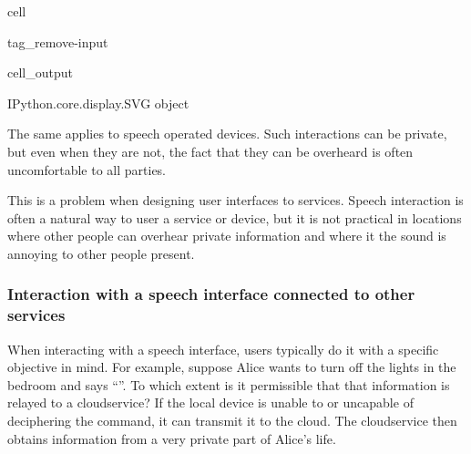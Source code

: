 \documentclass[letterpaper,10pt,english]{jupyterBook}
\begin{document}
\begin{sphinxuseclass}{cell}
\begin{sphinxuseclass}{tag_remove-input}\begin{sphinxVerbatimOutput}

\begin{sphinxuseclass}{cell_output}
\begin{sphinxVerbatim}[commandchars=\\\{\}]
\PYGZlt{}IPython.core.display.SVG object\PYGZgt{}
\end{sphinxVerbatim}

\end{sphinxuseclass}\end{sphinxVerbatimOutput}

\end{sphinxuseclass}
\end{sphinxuseclass}
\sphinxAtStartPar
The same applies to speech operated devices. Such interactions can be private, but even when they are not, the fact that they can be overheard is often uncomfortable to all parties.

\sphinxAtStartPar
This is a problem when designing user interfaces to services. Speech interaction is often a natural way to user a service or device, but it is not practical in locations where other people can overhear private information and where it the sound is annoying to other people present.


\subsubsection{Interaction with a speech interface connected to other services}
\label{\detokenize{Security_and_privacy:interaction-with-a-speech-interface-connected-to-other-services}}
\sphinxAtStartPar
When interacting with a speech interface, users typically do it with a specific objective in mind. For example, suppose Alice wants to turn off the lights in the bedroom and says “”. To which extent is it permissible that that information is relayed to a cloud\sphinxhyphen{}service? If the local device is unable to or uncapable of deciphering the command, it can transmit it to the cloud. The cloud\sphinxhyphen{}service then obtains information from a very private part of Alice’s life.
\end{document}
